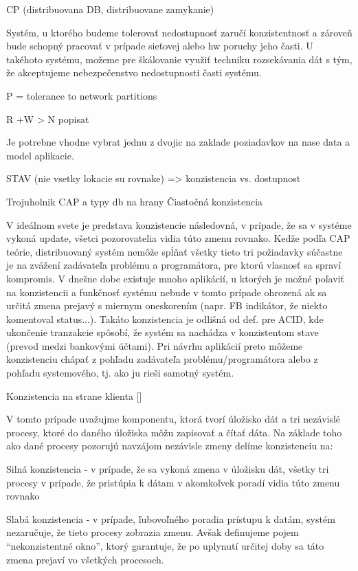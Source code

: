 \documentclass[11pt,twoside,a4paper]{book}
\begin{document}
CP (distribuovana DB, distribuovane zamykanie)

Systém, u ktorého budeme tolerovať nedostupnosť zaručí konzistentnosť a zároveň bude schopný pracovať v prípade sieťovej alebo hw poruchy jeho časti. U takéhoto systému, možeme pre škálovanie využiť techniku rozsekávania dát s tým, že akceptujeme nebezpečenstvo nedostupnosti časti systému.

P = tolerance to network partitions

R +W > N  popisat

Je potrebne vhodne vybrat jednu z dvojic na zaklade poziadavkov na nase data a model aplikacie.

STAV (nie vsetky lokacie su rovnake) => konzistencia vs. dostupnost

Trojuholnik CAP  a typy db na hrany
Čiastočná konzistencia

V ideálnom svete je predstava konzistencie následovná, v prípade, že sa v systéme vykoná update, všetci pozorovatelia vidia túto zmenu rovnako. Kedže podľa CAP teórie, distribuovaný systém nemôže spĺňať všetky tieto tri požiadavky súčastne je na zvážení zadávateľa problému a programátora, pre ktorú vlasnosť sa spraví kompromis. V dnešne dobe existuje mnoho aplikácií, u ktorých je možné poľaviť na konzistencii a funkčnosť systému nebude v tomto prípade ohrozená ak sa určitá zmena prejavý s miernym oneskorením (napr. FB indikátor, že niekto komentoval status...). Takáto konzistencia je odlišná od def. pre ACID, kde ukončenie tranzakcie spôsobí, že systém sa nachádza v konzistentom stave (prevod medzi bankovými účtami). Pri návrhu aplikácií preto môžeme konzistenciu chápať z pohľadu zadávateľa problému/programátora alebo z pohľadu systemového, tj. ako ju rieši samotný systém.

Konzistencia na strane klienta []

V tomto prípade uvažujme komponentu, ktorá tvorí úložisko dát a tri nezávislé procesy, ktoré do daného úložiska môžu zapisovať a čítať dáta. Na základe toho ako dané procesy pozorujú navzájom nezávisle zmeny delíme konzistenciu na:

Silná konzistencia - v prípade, že sa vykoná zmena v úložisku dát, všetky tri procesy v prípade, že pristúpia k dátam v akomkoľvek poradí vidia túto zmenu rovnako

Slabá konzistencia - v prípade, ľubovoľného poradia prístupu k datám, systém nezaručuje, že tieto procesy zobrazia zmenu. Avšak definujeme pojem “nekonzistentné okno”, ktorý garantuje, že po uplynutí určitej doby sa táto zmena prejaví vo všetkých procesoch.
\end{document}

